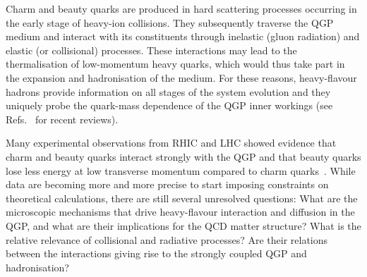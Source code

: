 Charm and beauty quarks are produced in hard scattering processes occurring in the early stage of heavy-ion collisions. They subsequently traverse the QGP medium and interact with its constituents through inelastic (gluon radiation) and elastic (or collisional) processes.
These interactions may lead to the thermalisation of low-momentum heavy quarks, which would thus take part in the expansion and hadronisation of the medium.
For these reasons, heavy-flavour hadrons provide information on all stages of the system evolution and they uniquely probe the quark-mass dependence of the QGP inner workings (see Refs.~\cite{Andronic:2015wma,Prino:2016cni,Rapp:2018qla} for recent reviews).

Many experimental observations from RHIC and LHC showed evidence that charm and beauty quarks interact strongly with the QGP and that beauty quarks lose less energy at low transverse momentum compared to charm quarks~\cite{Adam:2015nna,Khachatryan:2016ypw}. 
While data are becoming more and more precise to start imposing constraints on theoretical calculations, there are still several unresolved questions: What are the microscopic mechanisms that drive heavy-flavour interaction and diffusion in the QGP, and what are their implications for the QCD matter structure? What is the relative relevance of collisional and radiative processes? Are their relations between the interactions giving rise to the strongly coupled QGP and hadronisation?

